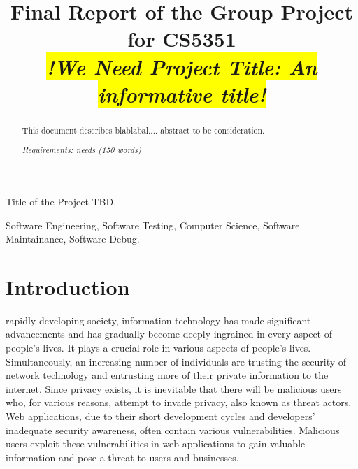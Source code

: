 \documentclass[journal]{IEEEtran}
\begin{document}
\title{Final Report of the Group Project for CS5351\\
\colorbox{yellow}{\textit{!We Need Project Title: An informative title!}}
}





%
{Title of the Project TBD.}

\maketitle

\begin{abstract}
This document describes blablabal....
abstract to be consideration.

\textit{Requirements: needs (150 words) }

\end{abstract}

\begin{IEEEkeywords}
Software Engineering, Software Testing, Computer Science, Software Maintainance, Software Debug.
\end{IEEEkeywords}


\section{Introduction}
 rapidly developing society, information technology has made significant advancements and has gradually become deeply ingrained in every aspect of people's lives. It plays a crucial role in various aspects of people's lives. Simultaneously, an increasing number of individuals are trusting the security of network technology and entrusting more of their private information to the internet. Since privacy exists, it is inevitable that there will be malicious users who, for various reasons, attempt to invade privacy, also known as threat actors. Web applications, due to their short development cycles and developers' inadequate security awareness, often contain various vulnerabilities. Malicious users exploit these vulnerabilities in web applications to gain valuable information and pose a threat to users and businesses.
\end{document}
